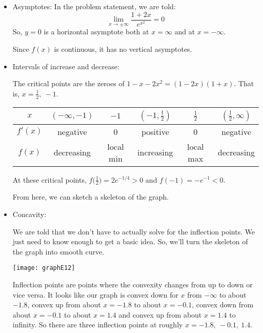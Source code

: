 \begin{solution}
\begin{itemize}
\item Asymptotes:
In the problem statement, we are told:
\[\lim_{x \to \pm \infty}\frac{1+2x}{e^{x^2}}=0\]
So, $y=0$ is a horizontal asymptote both at $x=\infty$ and at $x=-\infty$.

Since $f(x)$ is continuous, it has no vertical asymptotes.

\item Intervals of increase and decrease:

The critical points are the zeroes of $1-x-2x^2=(1-2x)(1+x)$. That is,
 $x=\frac{1}{2},\ -1$.

\begin{center}
\begin{tabular}{|c||c|c|c|c|c|}
\hline
$x$&$(-\infty,-1)$&$-1$&$(-1,\frac{1}{2})$&$\frac{1}{2}$&$(\frac{1}{2},\infty)$\\
\hline
$f'(x)$&negative&0&positive&0&negative\\
\hline
$f(x)$&decreasing&local min&increasing&local max&decreasing\\
\hline
\end{tabular}
\end{center}
At these critical points, $f\big(\frac{1}{2}\big)=2e^{-1/4}>0$ and $f(-1)=-e^{-1}<0$.

From here, we can sketch a skeleton of the graph.
\begin{center}
\end{center}

\item Concavity:

We are told that we don't have to actually solve for the inflection points. We just need to know enough to get a basic idea. So, we'll turn the skeleton of the graph into smooth curve.

\begin{center}\texttt{[image: graphE12]}\end{center}

Inflection points are points where the convexity changes from up
to down or vice versa. It looks like our graph is convex down for $x$ from
$-\infty$ to about $-1.8$, convex up from about $x=-1.8$ to about $x=-0.1$,
convex down from about $x=-0.1$ to about $x=1.4$ and convex up from about
$x=1.4$ to infinity. So there are three inflection points at roughly
$x=-1.8,\ -0.1,\ 1.4$.
\end{itemize}
\end{solution}


